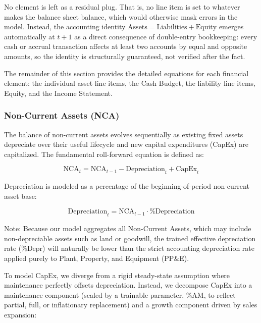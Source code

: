 \documentclass[12pt,a4paper]{article}
\begin{document}
No element is left as a residual plug. That is, no line item is set to
whatever makes the balance sheet balance, which would otherwise mask
errors in the model. Instead, the accounting identity
$\text{Assets} = \text{Liabilities} + \text{Equity}$ emerges
automatically at $t+1$ as a direct consequence of double-entry
bookkeeping: every cash or accrual transaction affects at least two
accounts by equal and opposite amounts, so the identity is structurally
guaranteed, not verified after the fact.

The remainder of this section provides the detailed equations for each
financial element: the individual asset line items, the Cash Budget,
the liability line items, Equity, and the Income Statement.

\subsubsection{Non-Current Assets (NCA)}

The balance of non-current assets evolves sequentially as existing fixed
assets depreciate over their useful lifecycle and new capital
expenditures (CapEx) are capitalized. The fundamental roll-forward
equation is defined as:

\begin{equation}\label{eq:nca_rollforward}
\text{NCA}_t = \text{NCA}_{t-1} - \text{Depreciation}_t + \text{CapEx}_t
\end{equation}

Depreciation is modeled as a percentage of the beginning-of-period
non-current asset base:

\begin{equation}\label{eq:depreciation}
\text{Depreciation}_t = \text{NCA}_{t-1} \cdot \text{\%Depreciation}
\end{equation}

Note: Because our model aggregates all Non-Current Assets, which may
include non-depreciable assets such as land or goodwill, the trained
effective depreciation rate (\%Depr) will naturally be lower than the
strict accounting depreciation rate applied purely to Plant, Property,
and Equipment (PP\&E).

To model CapEx, we diverge from a rigid steady-state assumption where
maintenance perfectly offsets depreciation. Instead, we decompose CapEx
into a maintenance component (scaled by a trainable parameter, \%AM, to
reflect partial, full, or inflationary replacement) and a growth
component driven by sales expansion:
\end{document}
